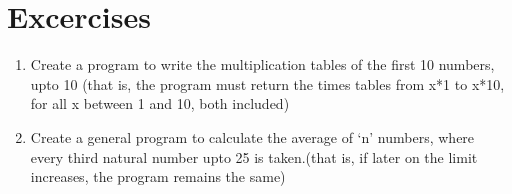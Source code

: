 \section{Excercises}
\begin{enumerate}
\item Create a program to write the multiplication tables of the first 10 numbers, upto 10 (that is, the program must return the times tables from x*1 to x*10, for all x between 1 and 10, both included)
\item Create a general program to calculate the average of `n' numbers, where every third natural number upto 25 is taken.(that is, if later on the limit increases, the program remains the same)
\end{enumerate}
